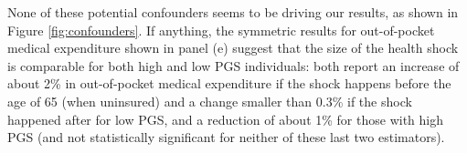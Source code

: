 \documentclass[11pt]{article}
\begin{document}
None of these potential confounders seems to be driving our results, as shown in Figure \ref{fig:confounders}.
If anything, the symmetric results for out-of-pocket medical expenditure shown in panel (e) suggest that the size of the health shock is comparable for both high and low PGS individuals: both report an increase of about 2\% in out-of-pocket medical expenditure if the shock happens before the age of 65 (when uninsured) and a change smaller than 0.3\% if the shock happened after for low PGS, and a reduction of about 1\% for those with high PGS (and not statistically significant for neither of these last two estimators).

\begin{figure}[ht]
	\begin{center}
\end{center}
\end{figure}
\end{document}
